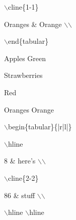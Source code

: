 \documentclass[a4paper,portrait,12pt]{article}
\begin{document}
\begin{flushleft}
\ensuremath{\backslash}cline\{1-1\}
\end{flushleft}


\begin{flushleft}
Oranges \& Orange \ensuremath{\backslash}\ensuremath{\backslash}
\end{flushleft}


\begin{flushleft}
\ensuremath{\backslash}end\{tabular\}
\end{flushleft}





\begin{flushleft}
Apples Green
\end{flushleft}


\begin{flushleft}
Strawberries
\end{flushleft}


\begin{flushleft}
Red
\end{flushleft}


\begin{flushleft}
Oranges Orange
\end{flushleft}





\begin{flushleft}
\ensuremath{\backslash}begin\{tabular\}\{|r|l|\}
\end{flushleft}


\begin{flushleft}
\ensuremath{\backslash}hline
\end{flushleft}


\begin{flushleft}
8 \& here's \ensuremath{\backslash}\ensuremath{\backslash}
\end{flushleft}


\begin{flushleft}
\ensuremath{\backslash}cline\{2-2\}
\end{flushleft}


\begin{flushleft}
86 \& stuff \ensuremath{\backslash}\ensuremath{\backslash}
\end{flushleft}


\begin{flushleft}
\ensuremath{\backslash}hline \ensuremath{\backslash}hline
\end{flushleft}
\end{document}
